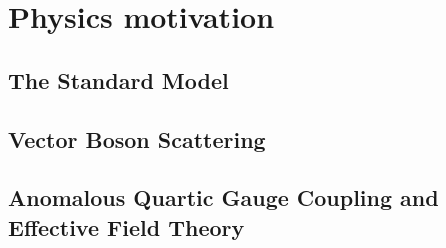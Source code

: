 \chapter{Physics motivation}
\section{The Standard Model}
\section{Vector Boson Scattering}
\section{Anomalous Quartic Gauge Coupling and Effective Field Theory}


